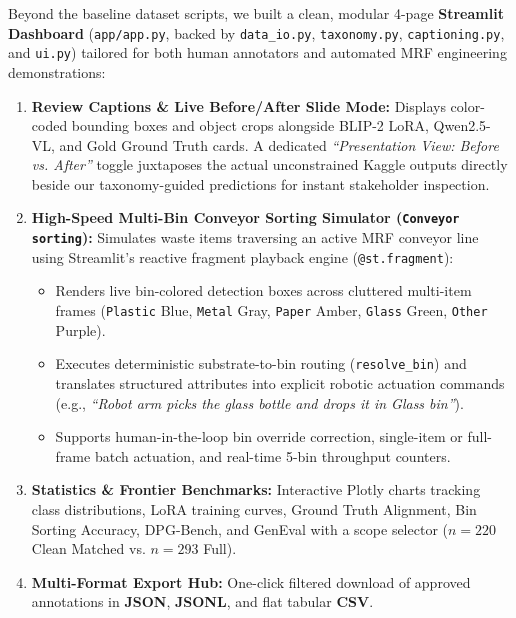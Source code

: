 \documentclass[11pt,a4paper]{article}
\begin{document}
Beyond the baseline dataset scripts, we built a clean, modular 4-page \textbf{Streamlit Dashboard} (\texttt{app/app.py}, backed by \texttt{data\_io.py}, \texttt{taxonomy.py}, \texttt{captioning.py}, and \texttt{ui.py}) tailored for both human annotators and automated MRF engineering demonstrations:

\begin{enumerate}[leftmargin=1.5em]
    \item \textbf{Review Captions \& Live Before/After Slide Mode:} Displays color-coded bounding boxes and object crops alongside BLIP-2 LoRA, Qwen2.5-VL, and Gold Ground Truth cards. A dedicated \textit{``Presentation View: Before vs. After''} toggle juxtaposes the actual unconstrained Kaggle outputs directly beside our taxonomy-guided predictions for instant stakeholder inspection.
    \item \textbf{High-Speed Multi-Bin Conveyor Sorting Simulator (\texttt{Conveyor sorting}):} Simulates waste items traversing an active MRF conveyor line using Streamlit's reactive fragment playback engine (\texttt{@st.fragment}):
    \begin{itemize}
        \item Renders live bin-colored detection boxes across cluttered multi-item frames (\texttt{Plastic} Blue, \texttt{Metal} Gray, \texttt{Paper} Amber, \texttt{Glass} Green, \texttt{Other} Purple).
        \item Executes deterministic substrate-to-bin routing (\texttt{resolve\_bin}) and translates structured attributes into explicit robotic actuation commands (e.g., \textit{``Robot arm picks the glass bottle and drops it in Glass bin''}).
        \item Supports human-in-the-loop bin override correction, single-item or full-frame batch actuation, and real-time 5-bin throughput counters.
    \end{itemize}
    \item \textbf{Statistics \& Frontier Benchmarks:} Interactive Plotly charts tracking class distributions, LoRA training curves, Ground Truth Alignment, Bin Sorting Accuracy, DPG-Bench, and GenEval with a scope selector ($n=220$ Clean Matched vs. $n=293$ Full).
    \item \textbf{Multi-Format Export Hub:} One-click filtered download of approved annotations in \textbf{JSON}, \textbf{JSONL}, and flat tabular \textbf{CSV}.
\end{enumerate}

\end{document}
